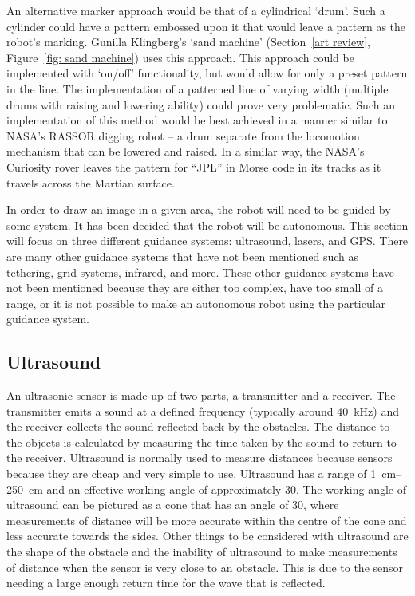     An alternative marker approach would be that of a cylindrical `drum'. Such a cylinder could have a pattern embossed upon it that would leave a pattern as the robot's marking. Gunilla Klingberg's `sand machine' (Section~\ref{art review}, Figure~\ref{fig: sand machine}) uses this approach. This approach could be implemented with `on/off' functionality, but would allow for only a preset pattern in the line. The implementation of a patterned line of varying width (\eg multiple drums with raising and lowering ability) could prove very problematic. Such an implementation of this method would be best achieved in a manner similar to NASA's RASSOR digging robot -- a drum separate from the locomotion mechanism that can be lowered and raised.\cite{Siceloff2013} In a similar way, the NASA's Curiosity rover leaves the pattern for ``JPL'' in Morse code in its tracks as it travels across the Martian surface.



    In order to draw an image in a given area, the robot will need to be guided by some system.
    It has been decided that the robot will be autonomous. This section will focus on three different guidance systems: ultrasound, lasers, and GPS. There are many other guidance systems that have not been mentioned such as tethering, grid systems, infrared, and more. These other guidance systems have not been mentioned because they are either too complex, have too small of a range, or it is not possible to make an autonomous robot using the particular guidance system.

    \subsection{Ultrasound}
        An ultrasonic sensor is made up of two parts, a transmitter and a receiver. The transmitter emits a sound at a defined frequency (typically around \SI{40}{\kilo\hertz}) and the receiver collects the sound reflected back by the obstacles. The distance to the objects is calculated by measuring the time taken by the sound to return to the receiver.
        Ultrasound is normally used to measure distances because sensors because they are cheap and very simple to use. Ultrasound has a range of \SIrange{1}{250}{\centi\meter} and an effective working angle of approximately 30\dg.\cite{ultrasoundrobots} The working angle of ultrasound can be pictured as a cone that has an angle of 30\dg, where measurements of distance will be more accurate within the centre of the cone and less accurate towards the sides. Other things to be considered with ultrasound are the shape of the obstacle and the inability of ultrasound to make measurements of distance when the sensor is very close to an obstacle. This is due to the sensor needing a large enough return time for the wave that is reflected.

